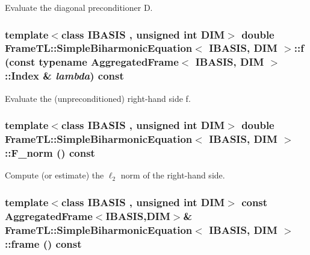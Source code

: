 Evaluate the diagonal preconditioner D. \hypertarget{classFrameTL_1_1SimpleBiharmonicEquation_cea8f8210b9b4717080f54b9aafa7e28}{
\subsubsection[{f}]{\setlength{\rightskip}{0pt plus 5cm}template$<$class IBASIS , unsigned int DIM$>$ double {\bf FrameTL::SimpleBiharmonicEquation}$<$ IBASIS, DIM $>$::f (const typename {\bf AggregatedFrame}$<$ IBASIS, DIM $>$::{\bf Index} \& {\em lambda}) const}}
\label{classFrameTL_1_1SimpleBiharmonicEquation_cea8f8210b9b4717080f54b9aafa7e28}


Evaluate the (unpreconditioned) right-hand side f. \hypertarget{classFrameTL_1_1SimpleBiharmonicEquation_45b992d91338680827a645647e11c95d}{
\subsubsection[{F\_\-norm}]{\setlength{\rightskip}{0pt plus 5cm}template$<$class IBASIS , unsigned int DIM$>$ double {\bf FrameTL::SimpleBiharmonicEquation}$<$ IBASIS, DIM $>$::F\_\-norm () const}}
\label{classFrameTL_1_1SimpleBiharmonicEquation_45b992d91338680827a645647e11c95d}


Compute (or estimate) the $\ell_2$ norm of the right-hand side. \hypertarget{classFrameTL_1_1SimpleBiharmonicEquation_bc2645843910a5f7021eba52f5f6c017}{
\subsubsection[{frame}]{\setlength{\rightskip}{0pt plus 5cm}template$<$class IBASIS , unsigned int DIM$>$ const {\bf AggregatedFrame}$<$IBASIS,DIM$>$\& {\bf FrameTL::SimpleBiharmonicEquation}$<$ IBASIS, DIM $>$::frame () const}}
\label{classFrameTL_1_1SimpleBiharmonicEquation_bc2645843910a5f7021eba52f5f6c017}


